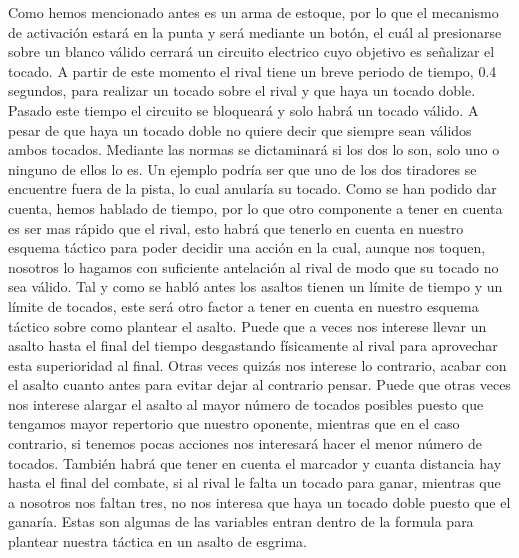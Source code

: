 Como hemos mencionado antes es un arma de estoque, por lo que el mecanismo de activación estará en la punta
 y será mediante un botón, el cuál al presionarse sobre un blanco válido cerrará un circuito electrico cuyo
 objetivo es señalizar el tocado. A partir de este momento el rival tiene un breve periodo de tiempo, 0.4 segundos,
 para realizar un tocado sobre el rival y que haya un tocado doble. Pasado este tiempo el circuito se bloqueará
 y solo habrá un tocado válido. A pesar de que haya un tocado doble no quiere decir que siempre sean válidos
 ambos tocados. Mediante las normas se dictaminará si los dos lo son, solo uno o ninguno de ellos lo es.
 Un ejemplo podría ser que uno de los dos tiradores se encuentre fuera de la pista, lo cual anularía su tocado.
 Como se han podido dar cuenta, hemos hablado de tiempo, por lo que otro componente a tener en cuenta es ser mas
 rápido que el rival, esto habrá que tenerlo en cuenta en nuestro esquema táctico para poder decidir una acción en
 la cual, aunque nos toquen, nosotros lo hagamos con suficiente antelación al rival de modo que su tocado no
 sea válido. Tal y como se habló antes los asaltos tienen un límite de tiempo y un límite de tocados,
 este será otro factor a tener en cuenta en nuestro esquema táctico sobre como plantear el asalto.
 Puede que a veces nos interese llevar un asalto hasta el final del tiempo desgastando físicamente al
 rival para aprovechar esta superioridad al final. Otras veces quizás nos interese lo contrario,
 acabar con el asalto cuanto antes para evitar dejar al contrario pensar. Puede que otras veces nos
 interese alargar el asalto al mayor número de tocados posibles puesto que tengamos mayor
 repertorio que nuestro oponente, mientras que en el caso contrario, si tenemos pocas acciones nos interesará
 hacer el menor número de tocados. También habrá que tener en cuenta el marcador y cuanta distancia hay
 hasta el final del combate, si al rival le falta un tocado para ganar, mientras que a nosotros nos faltan
 tres, no nos interesa que haya un tocado doble puesto que el ganaría. Estas son algunas de las variables
 entran dentro de la formula para plantear nuestra táctica en un asalto de esgrima.

